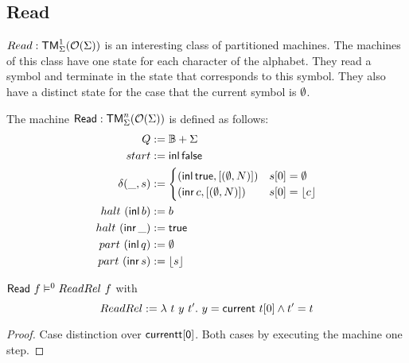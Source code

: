 \subsection{Read}
\label{sec:basic_machines-Read}

$Read : \mathsf{TM}_\Sigma^1(\mathcal{O}(\Sigma))$ is an interesting class of partitioned machines.  The machines of this class have one state for each character
of the alphabet.  They read a symbol and terminate in the state that corresponds to this symbol.  They also have a distinct state for the case that
the current symbol is $\emptyset$.

\begin{definition}[$\MS{Read}$]
  The machine $\mathsf{Read} : \mathsf{TM}_\Sigma^n(\mathcal{O}(\Sigma))$ is defined as follows:
  \begin{align*}
    Q          &:= \mathbb{B}+\Sigma \\
    start      &:= \operatorname{\mathsf{inl}} \mathsf{false} \\
    \delta (\_, s) &:=
                     \begin{cases}
                       (\operatorname{\mathsf{inl}} \mathsf{true}, \left[ (\emptyset, N) \right]) & s[0] = \emptyset \\
                       (\operatorname{\mathsf{inr}} c, \left[ (\emptyset, N) \right])     & s[0] = \left\lfloor {c} \right\rfloor
                     \end{cases} \\
    halt   ~ (\operatorname{\mathsf{inl}}  b) &:= b \\
    halt   ~ (\operatorname{\mathsf{inr}} \_) &:= \mathsf{true} \\
    part   ~ (\operatorname{\mathsf{inl}}  q) &:= \emptyset \\
    part   ~ (\operatorname{\mathsf{inr}}  s) &:= \left\lfloor {s} \right\rfloor
  \end{align*}
\end{definition}


\begin{lemma}
  \label{lem:Read_Sem} $\mathsf{Read}~f \mathrel{\vDash^{0}} ReadRel~f$ with
  \[
    ReadRel := \lambda~t~y~t'.~ y = \mathsf{current}~t[0] \land t' = t
  \]
\end{lemma}
\begin{proof}
  Case distinction over $\mathsf{current t[0]}$.  Both cases by executing the machine one step.
\end{proof}



